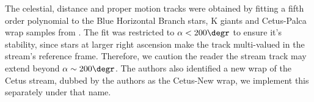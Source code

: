 The celestial, distance and proper motion tracks were obtained by fitting a fifth order polynomial to the Blue Horizontal Branch stars, K giants and Cetus-Palca wrap samples from \citet[][data provided by Z. Yuan priv. comm.]{Yuan2021}. The fit was restricted to $\alpha<200\degr$ to ensure it's stability, since stars at larger right ascension make the track multi-valued in the stream's reference frame. Therefore, we caution the reader the stream track may extend beyond $\alpha\sim 200\degr$. The authors also identified a new wrap of the Cetus stream, dubbed by the authors as the Cetus-New wrap, we implement this separately under that name.

